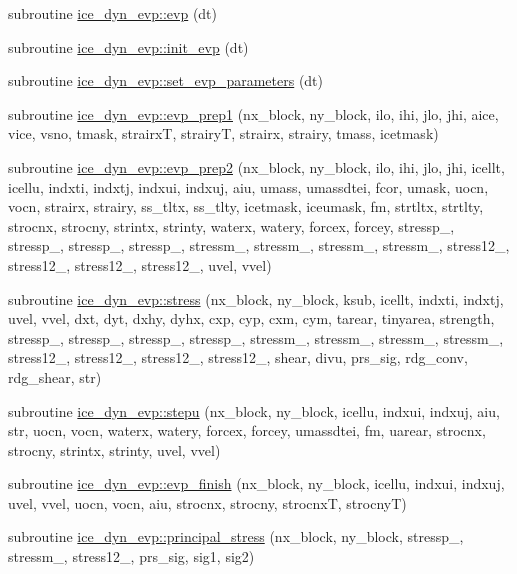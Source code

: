 \begin{DoxyCompactItemize}
\item 
subroutine \hyperlink{namespaceice__dyn__evp_a918e64924a8bc6d83610141982c8f5dd}{ice\_\-dyn\_\-evp::evp} (dt)
\item 
subroutine \hyperlink{namespaceice__dyn__evp_a58b637b31c877db0c8ac033d2249f49a}{ice\_\-dyn\_\-evp::init\_\-evp} (dt)
\item 
subroutine \hyperlink{namespaceice__dyn__evp_ae005a696d21f367a95138aca2aa5bb07}{ice\_\-dyn\_\-evp::set\_\-evp\_\-parameters} (dt)
\item 
subroutine \hyperlink{namespaceice__dyn__evp_acc726e42608cf46cb1990178a3ec0bf0}{ice\_\-dyn\_\-evp::evp\_\-prep1} (nx\_\-block, ny\_\-block, ilo, ihi, jlo, jhi, aice, vice, vsno, tmask, strairxT, strairyT, strairx, strairy, tmass, icetmask)
\item 
subroutine \hyperlink{namespaceice__dyn__evp_a8b2b9cdda98c21801a3180641ba3f000}{ice\_\-dyn\_\-evp::evp\_\-prep2} (nx\_\-block, ny\_\-block, ilo, ihi, jlo, jhi, icellt, icellu, indxti, indxtj, indxui, indxuj, aiu, umass, umassdtei, fcor, umask, uocn, vocn, strairx, strairy, ss\_\-tltx, ss\_\-tlty, icetmask, iceumask, fm, strtltx, strtlty, strocnx, strocny, strintx, strinty, waterx, watery, forcex, forcey, stressp\_, stressp\_, stressp\_, stressp\_, stressm\_, stressm\_, stressm\_, stressm\_, stress12\_, stress12\_, stress12\_, stress12\_, uvel, vvel)
\item 
subroutine \hyperlink{namespaceice__dyn__evp_a14a0351cda0756eaf7905bdec6b9e326}{ice\_\-dyn\_\-evp::stress} (nx\_\-block, ny\_\-block, ksub, icellt, indxti, indxtj, uvel, vvel, dxt, dyt, dxhy, dyhx, cxp, cyp, cxm, cym, tarear, tinyarea, strength, stressp\_, stressp\_, stressp\_, stressp\_, stressm\_, stressm\_, stressm\_, stressm\_, stress12\_, stress12\_, stress12\_, stress12\_, shear, divu, prs\_\-sig, rdg\_\-conv, rdg\_\-shear, str)
\item 
subroutine \hyperlink{namespaceice__dyn__evp_ac9b44f5692202d76ab19930c44aa8766}{ice\_\-dyn\_\-evp::stepu} (nx\_\-block, ny\_\-block, icellu, indxui, indxuj, aiu, str, uocn, vocn, waterx, watery, forcex, forcey, umassdtei, fm, uarear, strocnx, strocny, strintx, strinty, uvel, vvel)
\item 
subroutine \hyperlink{namespaceice__dyn__evp_a98d3c4b7bf9a4ca30d3c1d133792920e}{ice\_\-dyn\_\-evp::evp\_\-finish} (nx\_\-block, ny\_\-block, icellu, indxui, indxuj, uvel, vvel, uocn, vocn, aiu, strocnx, strocny, strocnxT, strocnyT)
\item 
subroutine \hyperlink{namespaceice__dyn__evp_ad8621c859aae602cd6702347e2db568b}{ice\_\-dyn\_\-evp::principal\_\-stress} (nx\_\-block, ny\_\-block, stressp\_, stressm\_, stress12\_, prs\_\-sig, sig1, sig2)
\end{DoxyCompactItemize}
